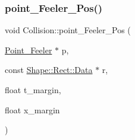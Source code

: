 \mbox{\label{namespace_collision_a2dc9bc6431ff0bf8511735ba027e1a23}} 
\subsubsection{\texorpdfstring{point\+\_\+\+Feeler\+\_\+\+Pos()}{point\_Feeler\_Pos()}}
{\footnotesize\ttfamily void Collision\+::point\+\_\+\+Feeler\+\_\+\+Pos (\begin{DoxyParamCaption}\item[{\mbox{\hyperlink{struct_collision_1_1_point___feeler}{Point\+\_\+\+Feeler}} $\ast$}]{p,  }\item[{const \mbox{\hyperlink{struct_shape_1_1_rect_1_1_data}{Shape\+::\+Rect\+::\+Data}} $\ast$}]{r,  }\item[{float}]{t\+\_\+margin,  }\item[{float}]{x\+\_\+margin }\end{DoxyParamCaption})}

